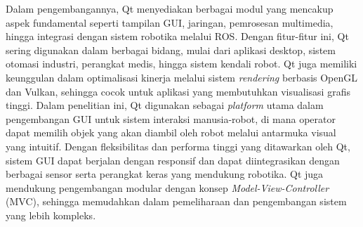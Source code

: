 Dalam pengembangannya, Qt menyediakan berbagai modul yang mencakup aspek fundamental seperti
tampilan GUI, jaringan, pemrosesan multimedia, hingga integrasi dengan sistem robotika melalui ROS. Dengan fitur-fitur ini,
Qt sering digunakan dalam berbagai bidang, mulai dari aplikasi desktop, sistem otomasi industri,
perangkat medis, hingga sistem kendali robot. Qt juga memiliki keunggulan dalam optimalisasi kinerja
melalui sistem \emph{rendering} berbasis OpenGL dan Vulkan, sehingga cocok untuk aplikasi yang membutuhkan
visualisasi grafis tinggi. Dalam penelitian ini, Qt digunakan sebagai \emph{platform} utama dalam pengembangan
GUI untuk sistem interaksi manusia-robot, di mana operator dapat memilih
objek yang akan diambil oleh robot melalui antarmuka visual yang intuitif. Dengan fleksibilitas dan
performa tinggi yang ditawarkan oleh Qt, sistem GUI dapat berjalan dengan responsif dan dapat diintegrasikan
dengan berbagai sensor serta perangkat keras yang mendukung robotika. Qt juga mendukung pengembangan modular
dengan konsep \emph{Model-View-Controller} (MVC), sehingga memudahkan dalam pemeliharaan dan pengembangan sistem
yang lebih kompleks.